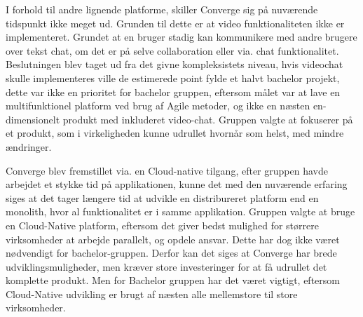 I forhold til andre lignende platforme, skiller Converge sig på nuværende tidspunkt ikke meget ud. Grunden til dette er at video funktionaliteten ikke er implementeret. Grundet at en bruger stadig kan kommunikere med andre brugere over tekst chat, om det er på selve collaboration eller via. chat funktionalitet. Beslutningen blev taget ud fra det givne kompleksistets niveau, hvis videochat skulle implementeres ville de estimerede point fylde et halvt bachelor projekt, dette var ikke en prioritet for bachelor gruppen, eftersom målet var at lave en multifunktionel platform ved brug af Agile metoder, og ikke en næsten en-dimensionelt produkt med inkluderet video-chat. Gruppen valgte at fokuserer på et produkt, som i virkeligheden kunne udrullet hvornår som helst, med mindre ændringer.

Converge blev fremstillet via. en Cloud-native tilgang, efter gruppen havde arbejdet et stykke tid på applikationen, kunne det med den nuværende erfaring siges at det tager længere tid at udvikle en distribureret platform end en monolith, hvor al funktionalitet er i samme applikation. Gruppen valgte at bruge en Cloud-Native platform, eftersom det giver bedst mulighed for størrere virksomheder at arbejde parallelt, og opdele ansvar. Dette har dog ikke været nødvendigt for bachelor-gruppen. Derfor kan det siges at Converge har brede udviklingsmuligheder, men kræver store investeringer for at få udrullet det komplette produkt. Men for Bachelor gruppen har det været vigtigt, eftersom Cloud-Native udvikling er brugt af næsten alle mellemstore til store virksomheder.

